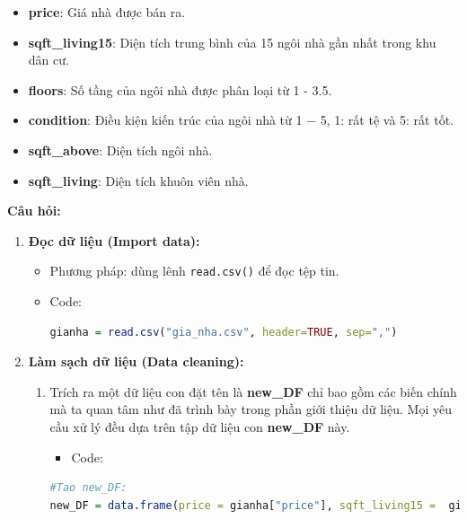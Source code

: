 \documentclass[a4paper]{article}
\theoremstyle{definition}
\begin{document}
\begin{itemize}
\begin{itemize}
    \item \textbf{price}: Giá nhà được bán ra.
    \item \textbf{sqft\_living15}: Diện tích trung bình của 15 ngôi nhà gần nhất trong khu dân cư.
    \item \textbf{floors}: Số tầng của ngôi nhà được phân loại từ 1 - 3.5.
    \item \textbf{condition}: Điều kiện kiến trúc của ngôi nhà từ 1 $-$ 5, 1: rất tệ và 5: rất tốt.
    \item \textbf{sqft\_above}: Diện tích ngôi nhà.
    \item \textbf{sqft\_living}: Diện tích khuôn viên nhà.
\end{itemize}
\textbf{Câu hỏi:}
\begin{enumerate}
    
    \item \textbf{Đọc dữ liệu (Import data):}
        \begin{itemize}
            \item Phương pháp: dùng lênh \texttt{read.csv()} để đọc tệp tin.
            \item Code:
            \begin{lstlisting}[language=R, caption=Code for question 1]
gianha = read.csv("gia_nha.csv", header=TRUE, sep=",")
            \end{lstlisting}
        \end{itemize}
    
    \item \textbf{Làm sạch dữ liệu (Data cleaning):}
    \begin{enumerate}
        \item  Trích ra một dữ liệu con đặt tên là \textbf{new\_DF} chỉ bao gồm các biến chính mà ta quan tâm như đã trình bày trong phần giới thiệu dữ liệu. Mọi yêu cầu xử lý đều dựa trên tập dữ liệu con \textbf{new\_DF} này.
        
\begin{itemize}
    
    \item Code:
\end{itemize}
        
        \begin{lstlisting}[language=R, caption=Code for question 2a]
#Tao new_DF:
new_DF = data.frame(price = gianha["price"], sqft_living15 =  gianha["sqft_living15"] ,floors = gianha["floors"], condition=gianha["condition"],sqft_above = gianha["sqft_above"], sqft_living = gianha["sqft_living"]) 
        \end{lstlisting}
        

\end{enumerate}
\end{enumerate}
\end{itemize}
\end{document}
